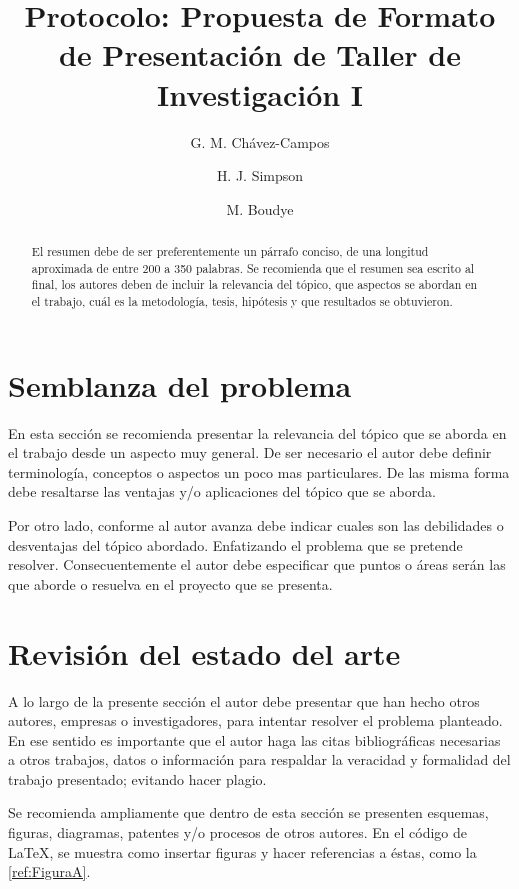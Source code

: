 \documentclass[twocolumns]{IEEEtran}
\title{Protocolo: Propuesta de Formato de Presentación de Taller de Investigación I}
\author[1]{G. M. Chávez-Campos}
\author[2]{H. J. Simpson}
\author[2]{M. Boudye}
\affil[1]{Departamento de Ingeniería Electrónica, Instituto Tecnológico de Morelia}
\affil[2]{Twenty Century Fox}
\begin{document}
\maketitle %
\begin{abstract}
El resumen debe de ser preferentemente un párrafo conciso, de una longitud aproximada de entre 200 a 350 palabras. Se recomienda que el resumen sea escrito al final, los autores deben de incluir la relevancia del tópico, que aspectos se abordan en el trabajo, cuál es la metodología, tesis, hipótesis y que resultados se obtuvieron.
\end{abstract}
\section{Semblanza del problema}

En esta sección se recomienda presentar la relevancia del tópico que se aborda en el trabajo desde un aspecto muy general. De ser necesario el autor debe definir terminología, conceptos o aspectos un poco mas particulares. De las misma forma debe resaltarse las ventajas y/o aplicaciones del tópico que se aborda.

Por otro lado, conforme al autor avanza debe indicar cuales son las debilidades o desventajas del tópico abordado. Enfatizando el problema que se pretende resolver. Consecuentemente el autor debe especificar que puntos o áreas serán las que aborde o resuelva en el proyecto que se presenta.

\section{Revisión del estado del arte}

A lo largo de la presente sección el autor debe presentar que han hecho otros autores, empresas o investigadores, para intentar resolver el problema planteado. En ese sentido es importante que el autor haga las citas bibliográficas necesarias a otros trabajos, datos o información para respaldar la veracidad y formalidad del trabajo presentado; evitando hacer plagio\cite{Chavez-Campos2016}\cite{pascual199012}.

Se recomienda ampliamente que dentro de esta sección se presenten esquemas, figuras, diagramas, patentes y/o procesos de otros autores. En el código de \LaTeX{}, se muestra como insertar figuras y hacer referencias a éstas, como la \figurename{} \ref{ref:FiguraA}. 
\end{document}
